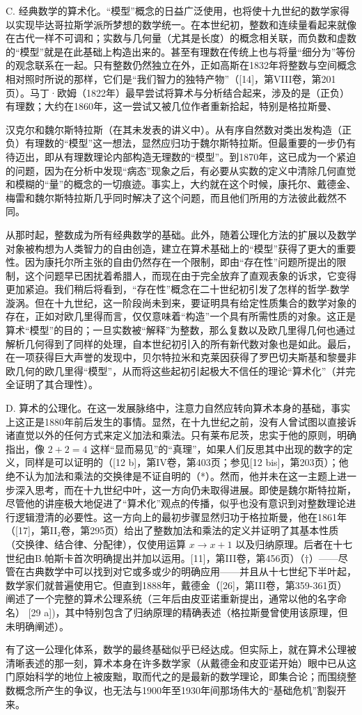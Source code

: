 C. 经典数学的算术化。“模型”概念的日益广泛使用，也将使十九世纪的数学家得以实现毕达哥拉斯学派所梦想的数学统一。在本世纪初，整数和连续量看起来就像在古代一样不可调和；实数与几何量（尤其是长度）的概念相关联，而负数和虚数的“模型”就是在此基础上构造出来的。甚至有理数在传统上也与将量“细分为”等份的观念联系在一起。只有整数仍然独立在外，正如高斯在1832年将整数与空间概念相对照时所说的那样，它们是“我们智力的独特产物”（{[}14{]}，第VIII卷，第201页）。马丁·欧姆（1822年）最早尝试将算术与分析结合起来，涉及的是（正负）有理数；大约在1860年，这一尝试又被几位作者重新拾起，特别是格拉斯曼、

汉克尔和魏尔斯特拉斯（在其未发表的讲义中）。从有序自然数对类出发构造（正负）有理数的“模型”这一想法，显然应归功于魏尔斯特拉斯。但最重要的一步仍有待迈出，即从有理数理论内部构造无理数的“模型”。到1870年，这已成为一个紧迫的问题，因为在分析中发现“病态”现象之后，有必要从实数的定义中清除几何直觉和模糊的“量”的概念的一切痕迹。事实上，大约就在这个时候，康托尔、戴德金、梅雷和魏尔斯特拉斯几乎同时解决了这个问题，而且他们所用的方法彼此截然不同。

从那时起，整数成为所有经典数学的基础。此外，随着公理化方法的扩展以及数学对象被构想为人类智力的自由创造，建立在算术基础上的“模型”获得了更大的重要性。因为康托尔所主张的自由仍然存在一个限制，即由“存在性”问题所提出的限制，这个问题早已困扰着希腊人，而现在由于完全放弃了直观表象的诉求，它变得更加紧迫。我们稍后将看到，“存在性”概念在二十世纪初引发了怎样的哲学-数学漩涡。但在十九世纪，这一阶段尚未到来，要证明具有给定性质集合的数学对象的存在，正如对欧几里得而言，仅仅意味着“构造”一个具有所需性质的对象。这正是算术“模型”的目的；一旦实数被“解释”为整数，那么复数以及欧几里得几何也通过解析几何得到了同样的处理，自本世纪初引入的所有新代数对象也是如此。最后，在一项获得巨大声誉的发现中，贝尔特拉米和克莱因获得了罗巴切夫斯基和黎曼非欧几何的欧几里得“模型”，从而将这些起初引起极大不信任的理论“算术化”（并完全证明了其合理性）。

D. 算术的公理化。在这一发展脉络中，注意力自然应转向算术本身的基础，事实上这正是1880年前后发生的事情。显然，在十九世纪之前，没有人曾试图以直接诉诸直觉以外的任何方式来定义加法和乘法。只有莱布尼茨，忠实于他的原则，明确指出，像 \(2 + 2 = 4\) 这样“显而易见”的“真理”，如果人们反思其中出现的数字的定义，同样是可以证明的（{[}12 b{]}，第IV卷，第403页；参见{[}12 bis{]}，第203页）；他绝不认为加法和乘法的交换律是不证自明的（*）。然而，他并未在这一主题上进一步深入思考，而在十九世纪中叶，这一方向仍未取得进展。即使是魏尔斯特拉斯，尽管他的讲座极大地促进了“算术化”观点的传播，似乎也没有意识到对整数理论进行逻辑澄清的必要性。这一方向上的最初步骤显然归功于格拉斯曼，他在1861年（{[}17{]}，第II₂卷，第295页）给出了整数加法和乘法的定义并证明了其基本性质（交换律、结合律、分配律），仅使用运算 \(x \rightarrow x + 1\) 以及归纳原理。后者在十七世纪由B.帕斯卡首次明确提出并加以运用。{[}11{]}，第III卷，第456页）（†）——尽管在古典数学中可以找到对它或多或少的明确应用——并且从十七世纪下半叶起，数学家们就普遍使用它。但直到1888年，戴德金（{[}26{]}，第III卷，第359-361页）阐述了一个完整的算术公理系统（三年后由皮亚诺重新提出，通常以他的名字命名） {[}29 a{]})，其中特别包含了归纳原理的精确表述（格拉斯曼曾使用该原理，但未明确阐述）。

有了这一公理化体系，数学的最终基础似乎已经达成。但实际上，就在算术公理被清晰表述的那一刻，算术本身在许多数学家（从戴德金和皮亚诺开始）眼中已从这门原始科学的地位上被废黜，取而代之的是最新的数学理论，即集合论；而围绕整数概念所产生的争议，也无法与1900年至1930年间那场伟大的“基础危机”割裂开来。

